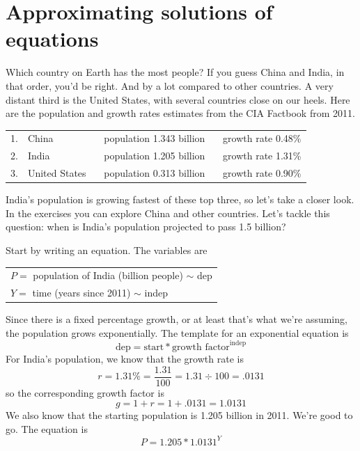 
\section{Approximating solutions of equations}

Which country on Earth has the most people?  If you guess China and India, in that order, you'd be right.  And by a lot compared to other countries.  A very distant third is the United States, with several countries close on our heels.  Here are the population and growth rates estimates from the CIA Factbook from 2011.
\begin{center}
\begin{tabular} {llll}
1. & China & population 1.343 billion & growth rate 0.48\% \\
2. & India & population 1.205 billion & growth rate 1.31\%\\
3. & United States \quad~& population 0.313 billion \quad~  & growth rate 0.90\%\\ 
\end{tabular}
\end{center}

India's population is growing fastest of these top three, so let's take a closer look.  In the exercises 
you can explore China and other countries. 
Let's tackle this question: when is India's population projected to pass 1.5 billion?

Start by writing an equation.  The variables are
\begin{center}
\begin{tabular} {l} 
$P=$ population of India (billion people) $\sim$ dep \\
$Y= $ time (years since 2011) $\sim$ indep \\ 
\end{tabular}
\end{center}
Since there is a fixed percentage growth, or at least that's what we're assuming, the population grows exponentially.  The template for an exponential equation is 
$$\text{dep} = \text{start} \ast \text{growth factor} ^ {\text{indep}}$$
For India's population, we know that the growth rate is 
$$r=1.31\% = \frac{1.31}{100} = 1.31 \div 100 = .0131$$
so the corresponding growth factor is 
$$g=1+r=1+.0131=1.0131$$
We also know that the starting population is 1.205 billion in 2011.  We're good to go. The equation is
$$P = 1.205 \ast 1.0131^Y$$

